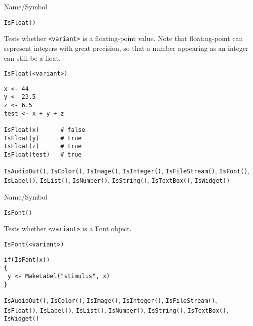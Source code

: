 \begin{desc}{Name/Symbol}
\item[Name/Symbol]	\verb+IsFloat()+

\item[Description] Tests whether \verb+<variant>+ is a floating-point
  value. Note that floating-point can represent integers with great
  precision, so that a number appearing as an integer can still be a
  float.

\item[Usage]
\begin{verbatim}
IsFloat(<variant>)
\end{verbatim}

\item[Example]
\begin{verbatim}
x <- 44
y <- 23.5
z <- 6.5
test <- x + y + z 

IsFloat(x)     	# false
IsFloat(y)     	# true
IsFloat(z)     	# true
IsFloat(test)  	# true
\end{verbatim}

\item[See Also] \verb+IsAudioOut()+, \verb+IsColor()+,
  \verb+IsImage()+, \verb+IsInteger()+, \verb+IsFileStream()+,
  \verb+IsFont()+, \verb+IsLabel()+, \verb+IsList()+,
  \verb+IsNumber()+, \verb+IsString()+, \verb+IsTextBox()+,
  \verb+IsWidget()+
\end{desc}



\begin{desc}{Name/Symbol}
\item[Name/Symbol]	\verb+IsFont()+

\item[Description]	Tests whether \verb+<variant>+ is a Font object.

\item[Usage]
\begin{verbatim}
IsFont(<variant>)
\end{verbatim}

\item[Example]	
\begin{verbatim}
if(IsFont(x))
{
 y <- MakeLabel("stimulus", x)
}
\end{verbatim}

\item[See Also] \verb+IsAudioOut()+, \verb+IsColor()+,
  \verb+IsImage()+, \verb+IsInteger()+, \verb+IsFileStream()+,
  \verb+IsFloat()+, \verb+IsLabel()+, \verb+IsList()+,
  \verb+IsNumber()+, \verb+IsString()+, \verb+IsTextBox()+,
  \verb+IsWidget()+
\end{desc}



